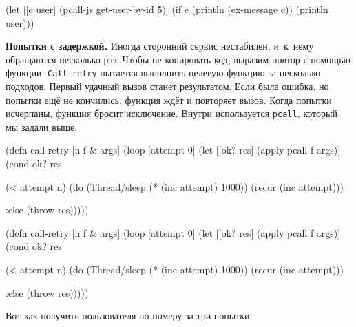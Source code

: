 \else

\begin{english}
  \begin{clojure}
(let [[e user] (pcall-js get-user-by-id 5)]
  (if e
    (println (ex-message e))
    (println user)))
  \end{clojure}
\end{english}

\fi


\textbf{Попытки с задержкой.} Иногда сторонний сервис нестабилен, и~к~нему
обращаются несколько раз. Чтобы не копировать код, выразим повтор с помощью
функции. \verb|Call-retry| пытается выполнить целевую функцию за несколько
подходов. Первый удачный вызов станет результатом. Если была ошибка, но попытки
ещё не кончились, функция ждёт и повторяет вызов. Когда попытки исчерпаны,
функция бросит исключение. Внутри используется \verb|pcall|, который мы задали
выше.


\ifnarrow

\begin{english}
  \begin{clojure}
(defn call-retry [n f & args]
  (loop [attempt 0]
    (let [[ok? res] (apply pcall f args)]
      (cond
        ok? res

        (< attempt n)
        (do (Thread/sleep
             (* (inc attempt) 1000))
            (recur (inc attempt)))

        :else (throw res)))))
  \end{clojure}
\end{english}

\else

\begin{english}
  \begin{clojure}
(defn call-retry [n f & args]
  (loop [attempt 0]
    (let [[ok? res] (apply pcall f args)]
      (cond
        ok? res

        (< attempt n)
        (do (Thread/sleep (* (inc attempt) 1000))
            (recur (inc attempt)))

        :else (throw res)))))
  \end{clojure}
\end{english}

\fi

\pagebreaklarge[3]

Вот как получить пользователя по номеру за три попытки:

